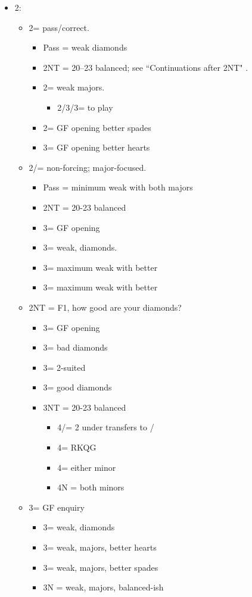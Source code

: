 \documentclass[a4paper,14pt]{extarticle}
\begin{document}
\begin{itemize}
\item 2\clubs:
	\begin{itemize}
   \item 2\diamonds = pass/correct.
			\begin{itemize}
		\item Pass = weak diamonds
      \item 2NT = 20--23 balanced; see ``Continuations after 2NT" .
      \item 2\hearts = weak majors.
			\begin{itemize}
			\item 2\spades/3\clubs/3\diamonds = to play
			\end{itemize}
		\item 2\spades = GF opening better spades
		\item 3\clubs = GF opening better hearts
		\end{itemize}
   \item 2\hearts/\spades = non-forcing; major-focused.
		\begin{itemize}
		\item Pass = minimum weak with both majors
		\item 2NT = 20-23 balanced
		\item 3\clubs = GF opening
		\item 3\diamonds = weak, diamonds.
		\item 3\hearts = maximum weak with better \hearts
		\item 3\spades = maximum weak with better \spades
		\end{itemize}
	\item 2NT = F1, how good are your diamonds?
		\begin{itemize}
		\item 3\clubs = GF opening
 		\item 3\diamonds = bad diamonds
		\item 3\hearts = 2-suited
		\item 3\spades = good diamonds
		\item 3NT = 20-23 balanced
			\begin{itemize}
         \item 4\clubs/\diamonds = 2 under transfers to \hearts/\spades
         \item 4\hearts = RKQG
			\item 4\spades = either minor
         \item 4N = both minors
			\end{itemize}
		\end{itemize}
	\item 3\clubs = GF enquiry
		\begin{itemize}
		\item 3\diamonds = weak, diamonds
		\item 3\hearts = weak, majors, better hearts
		\item 3\spades = weak, majors, better spades
		\item 3N = weak, majors, balanced-ish
		\end{itemize}


\end{itemize}
\end{itemize}
\end{document}
